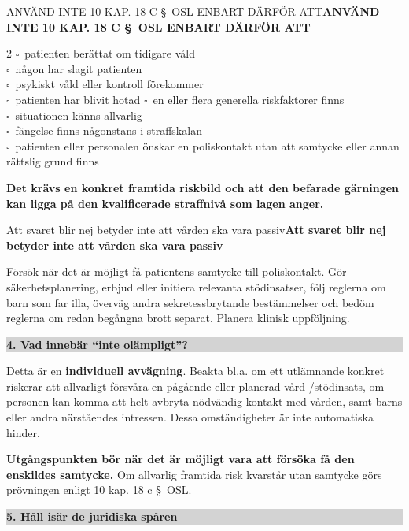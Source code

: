\documentclass[10pt,a4paper]{article}
\newcommand{\cb}{\(\square\)}
\newenvironment{alertbox}[1]{%
  \def\boxtitle{#1}%
  \begin{lrbox}{\legacybox}%
  \begin{minipage}{0.955\linewidth}%
  \ifx\boxtitle\empty\else\textbf{#1}\par\smallskip\fi
}{%
  \end{minipage}%
  \end{lrbox}%
  \par\smallskip\noindent
  \fcolorbox{black}{lightgray}{\usebox{\legacybox}}%
  \par\smallskip
}
\newenvironment{thinbox}[1]{%
  \def\boxtitle{#1}%
  \begin{lrbox}{\legacybox}%
  \begin{minipage}{0.955\linewidth}%
  \ifx\boxtitle\empty\else\textbf{#1}\par\smallskip\fi
}{%
  \end{minipage}%
  \end{lrbox}%
  \par\smallskip\noindent
  \fcolorbox{midgray}{white}{\usebox{\legacybox}}%
  \par\smallskip
}
\newcommand{\sectionbar}[1]{%
  \par\smallskip\noindent
  \colorbox{lightgray}{\parbox{0.965\linewidth}{\bfseries #1}}%
  \par\smallskip
}
\begin{document}
\begin{alertbox}{ANVÄND INTE 10 KAP. 18 C \S\ OSL ENBART DÄRFÖR ATT}
\begin{multicols}{2}
\cb\ patienten berättat om tidigare våld\\
\cb\ någon har slagit patienten\\
\cb\ psykiskt våld eller kontroll förekommer\\
\cb\ patienten har blivit hotad
\columnbreak
\cb\ en eller flera generella riskfaktorer finns\\
\cb\ situationen känns allvarlig\\
\cb\ fängelse finns någonstans i straffskalan\\
\cb\ patienten eller personalen önskar en poliskontakt utan att samtycke eller annan rättslig grund finns
\end{multicols}
\textbf{Det krävs en konkret framtida riskbild och att den befarade gärningen kan ligga på den kvalificerade straffnivå som lagen anger.}
\end{alertbox}

\begin{thinbox}{Att svaret blir nej betyder inte att vården ska vara passiv}
Försök när det är möjligt få patientens samtycke till poliskontakt. Gör säkerhetsplanering, erbjud eller initiera relevanta stödinsatser, följ reglerna om barn som far illa, överväg andra sekretessbrytande bestämmelser och bedöm reglerna om redan begångna brott separat. Planera klinisk uppföljning.
\end{thinbox}

\sectionbar{4. Vad innebär ``inte olämpligt''?}

Detta är en \textbf{individuell avvägning}. Beakta bl.a. om ett utlämnande konkret riskerar att allvarligt försvåra en pågående eller planerad vård-/stödinsats, om personen kan komma att helt avbryta nödvändig kontakt med vården, samt barns eller andra närståendes intressen. Dessa omständigheter är inte automatiska hinder.

\textbf{Utgångspunkten bör när det är möjligt vara att försöka få den enskildes samtycke.} Om allvarlig framtida risk kvarstår utan samtycke görs prövningen enligt 10 kap. 18 c \S\ OSL.

\sectionbar{5. Håll isär de juridiska spåren}
\end{document}
